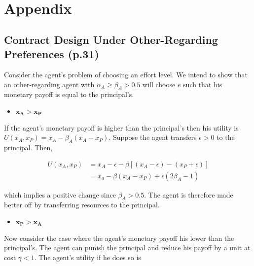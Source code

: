 \documentclass[12pt]{article}
\begin{document}
\newpage

\medskip




\newpage

\section{Appendix}
\subsection{Contract Design Under Other-Regarding Preferences (p.31)}

Consider the agent's problem of choosing an effort level. We intend to show that an other-regarding agent with $\alpha_A \geq \beta_A > 0.5$ will choose $e$ such that his monetary payoff is equal to the principal's. 

\begin{itemize}
\item $\mathbf{x_A > x_P}$
\end{itemize}


If the agent's monetary payoff is higher than the principal's then his utility is $U\left(x_A, x_P \right) = x_A - \beta_A \left(x_A-x_P\right)$. Suppose the agent transfers $\epsilon >0$ to the principal. Then,

\begin{equation*}
\begin{split}
 U\left(x_A,x_P \right) & = x_A - \epsilon - \beta \left[\left(x_A - \epsilon\right)-\left(x_P + \epsilon \right) \right] \\
& = x_a - \beta\left(x_A - x_P \right) + \epsilon \left(2\beta_A-1\right)
\end{split}
\end{equation*}

\noindent
which implies a positive change since $\beta_A >0.5$. The agent is therefore made better off by transferring resources to the principal.

\begin{itemize}
\item $\mathbf{x_P > x_A}$
\end{itemize}


Now consider the case where the agent's monetary payoff his lower than the principal's. The agent can punish the principal and reduce his payoff by a unit at cost $\gamma < 1$. The agent's utility if he does so is
\end{document}

